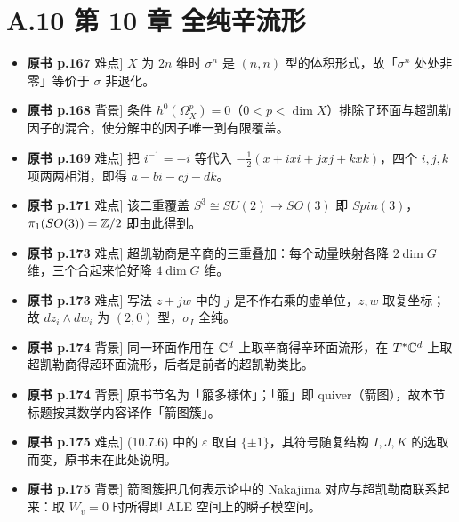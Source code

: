 \section*{A.10 第 10 章 全纯辛流形}
\begin{itemize}[leftmargin=2.4em,itemsep=4pt,label={\textbullet}]
\item \textbf{原书 p.167} 难点] $X$ 为 $2n$ 维时 $\sigma^n$ 是 $(n,n)$ 型的体积形式，故「$\sigma^n$ 处处非零」等价于 $\sigma$ 非退化。
\item \textbf{原书 p.168} 背景] 条件 $h^0(\Omega_X^p)=0$（$0<p<\dim X$）排除了环面与超凯勒因子的混合，使分解中的因子唯一到有限覆盖。
\item \textbf{原书 p.169} 难点] 把 $i^{-1}=-i$ 等代入 $-\frac12(x+ixi+jxj+kxk)$，四个 $i,j,k$ 项两两相消，即得 $a-bi-cj-dk$。
\item \textbf{原书 p.171} 难点] 该二重覆盖 $S^3\cong SU(2)\to SO(3)$ 即 $Spin(3)$，$\pi_1(SO(3))=\mathbb{Z}/2$ 即由此得到。
\item \textbf{原书 p.173} 难点] 超凯勒商是辛商的三重叠加：每个动量映射各降 $2\dim G$ 维，三个合起来恰好降 $4\dim G$ 维。
\item \textbf{原书 p.173} 难点] 写法 $z+jw$ 中的 $j$ 是不作右乘的虚单位，$z,w$ 取复坐标；故 $dz_i\wedge dw_i$ 为 $(2,0)$ 型，$\sigma_I$ 全纯。
\item \textbf{原书 p.174} 背景] 同一环面作用在 $\mathbb{C}^d$ 上取辛商得辛环面流形，在 $T^*\mathbb{C}^d$ 上取超凯勒商得超环面流形，后者是前者的超凯勒类比。
\item \textbf{原书 p.174} 背景] 原书节名为「箙多様体」；「箙」即 quiver（箭图），故本节标题按其数学内容译作「箭图簇」。
\item \textbf{原书 p.175} 难点] (10.7.6) 中的 $\varepsilon$ 取自 $\{\pm1\}$，其符号随复结构 $I,J,K$ 的选取而变，原书未在此处说明。
\item \textbf{原书 p.175} 背景] 箭图簇把几何表示论中的 Nakajima 对应与超凯勒商联系起来：取 $W_v=0$ 时所得即 ALE 空间上的瞬子模空间。
\end{itemize}

